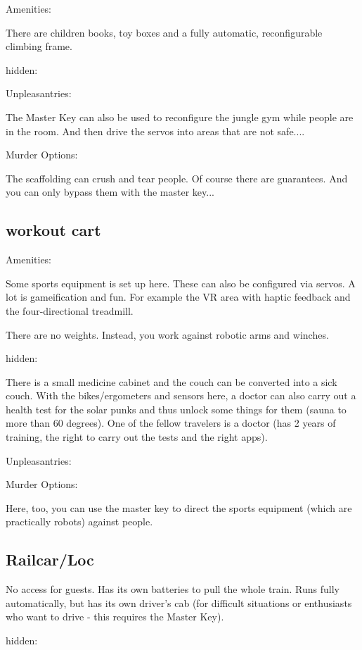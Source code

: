 \documentclass{book}
\begin{document}
Amenities:

There are children books, toy boxes and a fully automatic, reconfigurable climbing frame.

hidden:

Unpleasantries:

The Master Key can also be used to reconfigure the jungle gym while people are in the room. And then drive the servos into areas that are not safe....

Murder Options:

The scaffolding can crush and tear people. Of course there are guarantees. And you can only bypass them with the master key...

\subsection{workout cart}


Amenities:

Some sports equipment is set up here. These can also be configured via servos. A lot is gameification and fun. For example the VR area with haptic feedback and the four-directional treadmill.

There are no weights. Instead, you work against robotic arms and winches.

hidden:

There is a small medicine cabinet and the couch can be converted into a sick couch. With the bikes/ergometers and sensors here, a doctor can also carry out a health test for the solar punks and thus unlock some things for them (sauna to more than 60 degrees).
One of the fellow travelers is a doctor (has 2 years of training, the right to carry out the tests and the right apps).

Unpleasantries:

Murder Options:

Here, too, you can use the master key to direct the sports equipment (which are practically robots) against people.

\subsection{Railcar/Loc}


No access for guests. Has its own batteries to pull the whole train. Runs fully automatically, but has its own driver's cab (for difficult situations or enthusiasts who want to drive - this requires the Master Key).

hidden:
\end{document}
